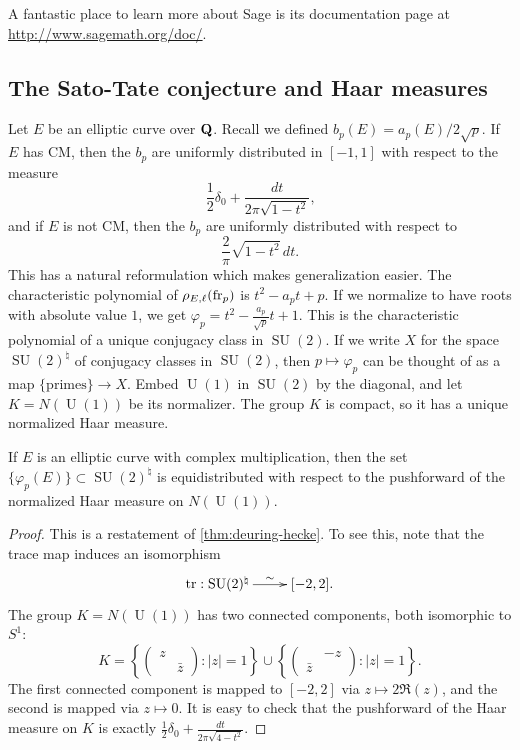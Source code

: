 A fantastic place to learn more about Sage is its documentation page at 
\url{http://www.sagemath.org/doc/}. 






\subsection{The Sato-Tate conjecture and Haar measures}

Let $E$ be an elliptic curve over $\mathbf{Q}$. Recall we defined 
$b_p(E) = a_p(E)/2\sqrt p$. If $E$ has CM, then the $b_p$ are 
uniformly distributed in $[-1,1]$ with respect to the measure 
\[
  \frac 1 2 \delta_0 + \frac{dt}{2\pi\sqrt{1-t^2}} \text{,}
\]
and if $E$ is not CM, then the $b_p$ are uniformly distributed with respect to 
\[
  \frac{2}{\pi} \sqrt{1-t^2}\, dt \text{.}
\]
This has a natural reformulation which makes generalization easier. The 
characteristic polynomial of $\rho_{E,\ell}(\mathrm{fr}_p)$ is 
$t^2-a_p t + p$. If we normalize to have roots with absolute value $1$, we get 
$\varphi_p = t^2 - \frac{a_p}{\sqrt p} t + 1$. This is the characteristic 
polynomial of a unique conjugacy class in $\operatorname{SU}(2)$. If we write 
$X$ for the space $\operatorname{SU}(2)^\natural$ of 
conjugacy classes in $\operatorname{SU}(2)$, then $p\mapsto \varphi_p$ can be 
thought of as a map $\{\text{primes}\} \to X$. Embed $\operatorname{U}(1)$ in 
$\operatorname{SU}(2)$ by the diagonal, and let $K=N(\operatorname{U}(1))$ be 
its normalizer. The group $K$ is compact, so it has a unique normalized Haar 
measure.

\begin{theorem}
If $E$ is an elliptic curve with complex multiplication, then the 
set $\{\varphi_p(E)\}\subset \operatorname{SU}(2)^\natural$ is 
equidistributed with respect to the pushforward of the normalized Haar measure 
on $N(\operatorname{U}(1))$. 
\end{theorem}
\begin{proof}
This is a restatement of \autoref{thm:deuring-hecke}. To see this, note 
that the trace map induces an isomorphism 
\[\xymatrix{
  \trace : \operatorname{SU}(2)^\natural \ar[r]^-\sim 
    & [-2,2] \text{.}
}\]
The group $K=N(\operatorname{U}(1))$ has two connected components, both 
isomorphic to $S^1$:
\[
  K = 
  \left\{\begin{pmatrix} 
    z & \\ 
    & \bar z 
  \end{pmatrix} : |z|=1 \right\} 
  \cup \left\{\begin{pmatrix}
         & -z\\ 
         \bar z & 
       \end{pmatrix} : |z|=1\right\} \text{.}
\]
The first connected component is mapped to $[-2,2]$ via 
$z\mapsto 2\Re (z)$, and the second is mapped via $z\mapsto 0$. It is easy to 
check that the pushforward of the Haar measure on $K$ is exactly 
$\frac 1 2 \delta_0 + \frac{dt}{2\pi \sqrt{4-t^2}}$. 
\end{proof}

